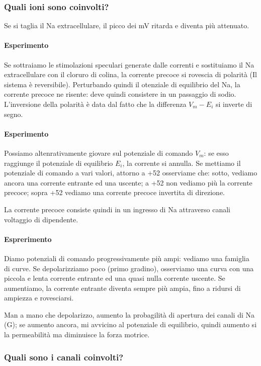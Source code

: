 \documentclass[a4paper,12pt]{article}
\begin{document}
\subsubsection{Quali ioni sono coinvolti?}
Se si taglia il Na extracellulare, il picco dei mV ritarda e diventa più attenuato. 
\paragraph{Esperimento}
Se sottraiamo le stimolazioni speculari generate dalle correnti e sostituiamo il Na extracellulare con il cloruro di colina, la corrente precoce si rovescia di polarità (Il sistema è reversibile). Perturbando quindi il otenziale di equilibrio del Na, la corrente precoce ne risente: deve quindi consistere in un passaggio di sodio. L'inversione della polarità è data dal fatto che la differenza $V_{m} - E_{i}$ si inverte di segno.
\paragraph{Esperimento}
Possiamo altenrativamente giovare sul potenziale di comando $V_{m}$: se esso raggiunge il potenziale di equilibrio $E_{i}$, la corrente si annulla. Se mettiamo il potenziale di comando a vari valori, attorno a +52 osserviame che: sotto, vediamo ancora una corrente entrante ed una uscente; a +52 non vediamo più la corrente precoce; sopra +52 vediamo una corrente precoce invertita di direzione.

La corrente precoce consiste quindi in un ingresso di Na attraverso canali voltaggio di dipendente.

\paragraph{Esprerimento}
Diamo potenziali di comando progressivamente più ampi: vediamo una famiglia di curve. Se depolarizziamo poco (primo gradino), osserviamo una curva con una piccola e lenta corrente entrante ed una quasi nulla corrente uscente. Se aumentiamo, la corrente entrante diventa sempre più ampia, fino a ridursi di ampiezza e rovesciarsi.

Man a mano che depolarizzo, aumento la probagilità di apertura dei canali di Na (G); se aumento ancora, mi avvicino al potenziale di equilibrio, quindi aumento si la permeabilità ma diminuisce la forza motrice.

\subsubsection{Quali sono i canali coinvolti?}
\end{document}
